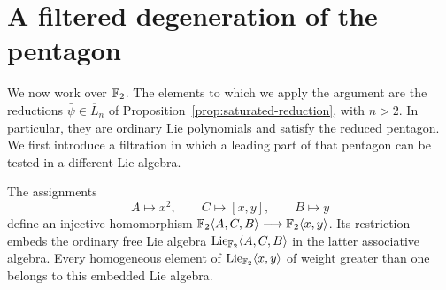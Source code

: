 \section{A filtered degeneration of the pentagon}
\label{sec:degeneration}

We now work over ${\mathbb F_2}$.  The elements to which we apply the
argument are the reductions $\bar\psi\in\overline L_n$ of
Proposition~\ref{prop:saturated-reduction}, with $n>2$.  In particular,
they are ordinary Lie polynomials and satisfy the reduced pentagon.
We first introduce a filtration in which a leading part of that pentagon
can be tested in a different Lie algebra.

\begin{samepage}
\begin{lemma}\label{lem:abc-free}
The assignments
\[
 A\longmapsto x^2,\qquad C\longmapsto[x,y],\qquad B\longmapsto y
\]
define an injective homomorphism
${\mathbb F_2}\langle A,C,B\rangle\longrightarrow{\mathbb F_2}\langle x,y\rangle$.
Its restriction embeds the ordinary free Lie algebra
$\operatorname{Lie}_{{\mathbb F_2}}\langle A,C,B\rangle$ in the latter associative algebra.
Every homogeneous element of $\operatorname{Lie}_{{\mathbb F_2}}\langle x,y\rangle$ of weight
greater than one belongs to this embedded Lie algebra.
\end{lemma}
\end{samepage}


